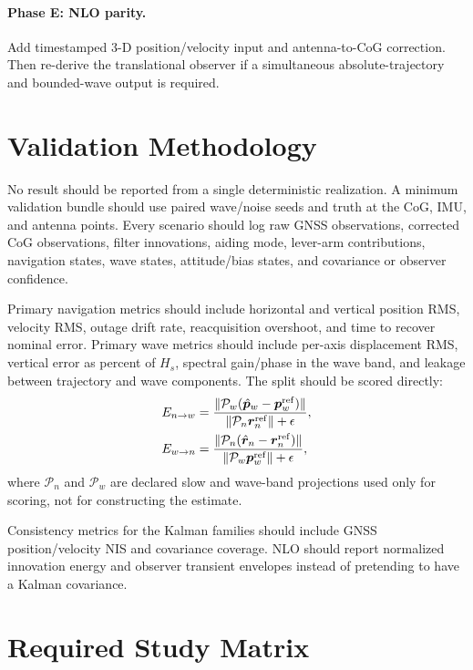 \documentclass[conference]{IEEEtran}
\DeclareRobustCommand{\vct}[1]{\bm{#1}}
\begin{document}
\paragraph{Phase E: NLO parity.}
Add timestamped 3-D position/velocity input and antenna-to-CoG correction.  Then
re-derive the translational observer if a simultaneous absolute-trajectory and
bounded-wave output is required.

\section{Validation Methodology}
\label{sec:validation}

No result should be reported from a single deterministic realization.  A minimum
validation bundle should use paired wave/noise seeds and truth at the CoG, IMU, and
antenna points.  Every scenario should log raw GNSS observations, corrected CoG
observations, filter innovations, aiding mode, lever-arm contributions, navigation
states, wave states, attitude/bias states, and covariance or observer confidence.

Primary navigation metrics should include horizontal and vertical position RMS,
velocity RMS, outage drift rate, reacquisition overshoot, and time to recover nominal
error.  Primary wave metrics should include per-axis displacement RMS, vertical error
as percent of $H_s$, spectral gain/phase in the wave band, and leakage between
trajectory and wave components.  The split should be scored directly:
\begin{align}
E_{n\rightarrow w}
&=\frac{\|\mathcal P_w(\hat{\vct p}_w-\vct p_w^{\rm ref})\|}
        {\|\mathcal P_n\vct r_n^{\rm ref}\|+\epsilon},\\
E_{w\rightarrow n}
&=\frac{\|\mathcal P_n(\hat{\vct r}_n-\vct r_n^{\rm ref})\|}
        {\|\mathcal P_w\vct p_w^{\rm ref}\|+\epsilon},
\label{eq:leakage-metrics}
\end{align}
where $\mathcal P_n$ and $\mathcal P_w$ are declared slow and wave-band projections
used only for scoring, not for constructing the estimate.

Consistency metrics for the Kalman families should include GNSS position/velocity NIS
and covariance coverage.  NLO should report normalized innovation energy and observer
transient envelopes instead of pretending to have a Kalman covariance.

\section{Required Study Matrix}
\label{sec:studies}
\end{document}
